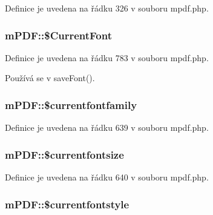 Definice je uvedena na řádku 326 v souboru mpdf.\-php.

\hypertarget{classm_p_d_f_a2dcd428ca1be1f6e6400a3c35ecd7a11}{
\subsubsection[{\$\-Current\-Font}]{\setlength{\rightskip}{0pt plus 5cm}m\-P\-D\-F\-::\$\-Current\-Font}}\label{classm_p_d_f_a2dcd428ca1be1f6e6400a3c35ecd7a11}


Definice je uvedena na řádku 783 v souboru mpdf.\-php.



Používá se v save\-Font().

\hypertarget{classm_p_d_f_aeda5fa7ef1a217299d1a05a4f55fea20}{
\subsubsection[{\$currentfontfamily}]{\setlength{\rightskip}{0pt plus 5cm}m\-P\-D\-F\-::\$currentfontfamily}}\label{classm_p_d_f_aeda5fa7ef1a217299d1a05a4f55fea20}


Definice je uvedena na řádku 639 v souboru mpdf.\-php.

\hypertarget{classm_p_d_f_aded68726702d8646674f5941816cb706}{
\subsubsection[{\$currentfontsize}]{\setlength{\rightskip}{0pt plus 5cm}m\-P\-D\-F\-::\$currentfontsize}}\label{classm_p_d_f_aded68726702d8646674f5941816cb706}


Definice je uvedena na řádku 640 v souboru mpdf.\-php.

\hypertarget{classm_p_d_f_afb6c692d8c6b059240058cf637af4c84}{
\subsubsection[{\$currentfontstyle}]{\setlength{\rightskip}{0pt plus 5cm}m\-P\-D\-F\-::\$currentfontstyle}}\label{classm_p_d_f_afb6c692d8c6b059240058cf637af4c84}


